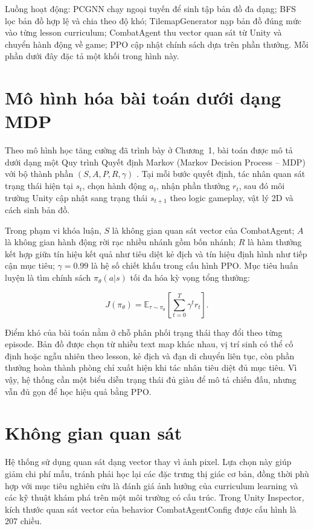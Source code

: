 Luồng hoạt động: PCGNN chạy ngoại tuyến để sinh tập bản đồ đa dạng; BFS lọc bản đồ hợp lệ và chia theo độ khó; TilemapGenerator nạp bản đồ đúng mức vào từng lesson curriculum; CombatAgent thu vector quan sát từ Unity và chuyển hành động về game; PPO cập nhật chính sách dựa trên phần thưởng. Mỗi phần dưới đây đặc tả một khối trong hình này.

\section{Mô hình hóa bài toán dưới dạng MDP}

Theo mô hình học tăng cường đã trình bày ở Chương~1, bài toán được mô tả dưới dạng một Quy trình Quyết định Markov (Markov Decision Process -- MDP) với bộ thành phần $(S,A,P,R,\gamma)$ \cite{Schulman2017}. Tại mỗi bước quyết định, tác nhân quan sát trạng thái hiện tại $s_t$, chọn hành động $a_t$, nhận phần thưởng $r_t$, sau đó môi trường Unity cập nhật sang trạng thái $s_{t+1}$ theo logic gameplay, vật lý 2D và cách sinh bản đồ.

Trong phạm vi khóa luận, $S$ là không gian quan sát vector của CombatAgent; $A$ là không gian hành động rời rạc nhiều nhánh gồm bốn nhánh; $R$ là hàm thưởng kết hợp giữa tín hiệu kết quả như tiêu diệt kẻ địch và tín hiệu định hình như tiếp cận mục tiêu; $\gamma=0.99$ là hệ số chiết khấu trong cấu hình PPO. Mục tiêu huấn luyện là tìm chính sách $\pi_{\theta}(a|s)$ tối đa hóa kỳ vọng tổng thưởng:

\begin{equation}
    J(\pi_\theta) = \mathbb{E}_{\tau \sim \pi_\theta}
    \left[\sum_{t=0}^{T}\gamma^t r_t\right].
\end{equation}

Điểm khó của bài toán nằm ở chỗ phân phối trạng thái thay đổi theo từng episode. Bản đồ được chọn từ nhiều text map khác nhau, vị trí sinh có thể cố định hoặc ngẫu nhiên theo lesson, kẻ địch và đạn di chuyển liên tục, còn phần thưởng hoàn thành phòng chỉ xuất hiện khi tác nhân tiêu diệt đủ mục tiêu. Vì vậy, hệ thống cần một biểu diễn trạng thái đủ giàu để mô tả chiến đấu, nhưng vẫn đủ gọn để học hiệu quả bằng PPO.

\section{Không gian quan sát}

Hệ thống sử dụng quan sát dạng vector thay vì ảnh pixel. Lựa chọn này giúp giảm chi phí mẫu, tránh phải học lại các đặc trưng thị giác cơ bản, đồng thời phù hợp với mục tiêu nghiên cứu là đánh giá ảnh hưởng của curriculum learning và các kỹ thuật khám phá trên một môi trường có cấu trúc. Trong Unity Inspector, kích thước quan sát vector của behavior CombatAgentConfig được cấu hình là 207 chiều.

